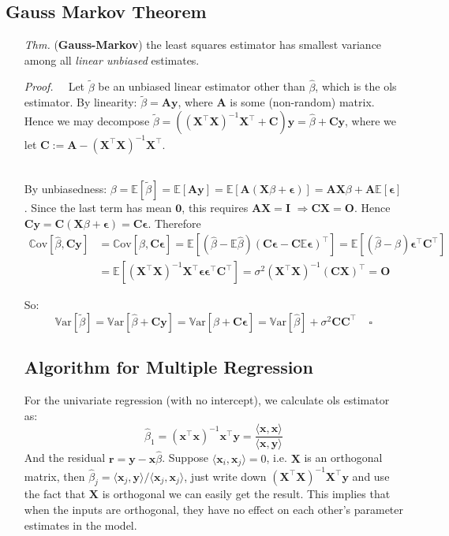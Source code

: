 \documentclass[a4paper, 11pt]{article}
\begin{document}
\subsection{Gauss Markov Theorem}
\begin{itemize}
	\item[\textit{Thm.}] (\textbf{Gauss-Markov}) the least squares estimator has smallest variance among all \emph{linear unbiased} estimates.

	\textit{Proof.~~} Let $\tilde{\beta}$ be an unbiased linear estimator other than $\hat{\beta}$, which is the ols estimator. By linearity: $\tilde{\beta} = \bm{A} \bm{y}$, where $\bm{A}$ is some (non-random) matrix. Hence we may decompose $\tilde{\beta} = ((\bm{X}^{\top} \bm{X})^{-1}\bm{X}^{\top} + \bm{C})\bm{y} = \hat{\beta} + \bm{Cy}$, where we let $\bm{C}:=\bm{A} - (\bm{X}^{\top} \bm{X})^{-1}\bm{X}^{\top}$. 

	~\\
	By unbiasedness: $\beta=\mathbb{E}[\tilde{\beta}] = \mathbb{E}\left[\bm{Ay}\right] = \mathbb{E}\left[\bm{A}(\bm{X}\beta + \bm{\epsilon})\right] = \bm{AX} \beta + \bm{A} \mathbb{E}\left[\bm{\epsilon}\right]$. Since the last term has mean $\bm{0}$, this requires $\bm{AX}=\bm{I}$ $\Rightarrow \bm{CX}=\bm{O}$. Hence $\bm{Cy} = \bm{C}(\bm{X}\beta + \bm{\epsilon}) = \bm{C \epsilon}$. Therefore
	\begin{equation}
		\begin{split}
			\mathrm{\mathbb{C}ov}[\hat{\beta}, \bm{Cy}] &= \mathrm{\mathbb{C}ov}[\hat{\beta}, \bm{C \epsilon}] = \mathbb{E}[(\hat{\beta} - \mathbb{E}\hat{\beta})(\bm{C \epsilon} - \bm{C}\mathbb{E}\bm{\epsilon})^{\top}] = \mathbb{E}[(\hat{\beta} - \beta)\bm{\epsilon}^{\top} \bm{C}^{\top}]  \\
			&= \mathbb{E}[(\bm{X}^{\top}\bm{X})^{-1} \bm{X}^{\top} \bm{\epsilon}\bm{\epsilon}^{\top} \bm{C}^{\top}] = \sigma^2 (\bm{X}^{\top} \bm{X})^{-1} (\bm{CX})^{\top} = \bm{O}
		\end{split}
	\end{equation}

	So: 
	$$
		\mathrm{\mathbb{V}ar}[\tilde{\beta}]  = \mathrm{\mathbb{V}ar}[\hat{\beta} + \bm{Cy}] = \mathrm{\mathbb{V}ar}[\hat{\beta} + \bm{C \bm{\epsilon}}] = \mathrm{\mathbb{V}ar}[\hat{\beta}] + \sigma^2 \bm{C}\bm{C}^{\top}~~~~~\square
	$$

	\subsection{Algorithm for Multiple Regression}
	For the univariate regression (with no intercept), we calculate ols estimator as:
	$$
	\hat{\beta}_1 = (\bm{x}^{\top}\bm{x})^{-1} \bm{x}^{\top} \bm{y} = \frac{\langle \bm{x}, \bm{x} \rangle}{\langle \bm{x}, \bm{y} \rangle}
	$$
	And the residual $\bm{r} = \bm{y} - \bm{x}\hat{\beta}$. Suppose $\langle \bm{x}_i, \bm{x}_j \rangle = 0$, i.e. $\bm{X}$ is an orthogonal matrix, then $\hat{\beta}_j = \langle \bm{x}_j, \bm{y} \rangle/ \langle \bm{x}_j, \bm{x}_j \rangle$, just write down $(\bm{X}^{\top}\bm{X})^{-1} \bm{X}^{\top} \bm{y}$ and use the fact that $\bm{X}$ is orthogonal we can easily get the result. This implies that when the inputs are orthogonal, they have no effect on each other's parameter estimates in the model.


\end{itemize}
\end{document}
